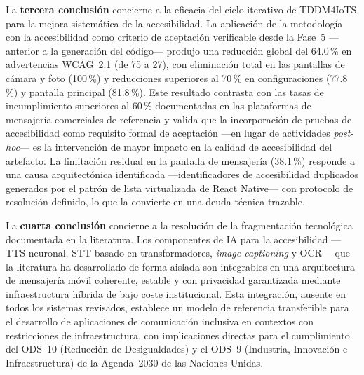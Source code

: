 \documentclass[journal]{IEEEtran}
\begin{document}
		La \textbf{tercera conclusi\'on} concierne a la eficacia del ciclo iterativo de TDDM4IoTS para la mejora sistem\'atica de la accesibilidad. La aplicaci\'on de la metodolog\'ia \cite{guerrero2020} con la accesibilidad como criterio de aceptaci\'on verificable desde la Fase~5 ---anterior a la generaci\'on del c\'odigo--- produjo una reducci\'on global del 64.0\,\% en advertencias WCAG~2.1 (de 75 a 27), con eliminaci\'on total en las pantallas de c\'amara y foto (100\,\%) y reducciones superiores al 70\,\% en configuraciones (77.8\,\%) y pantalla principal (81.8\,\%). Este resultado contrasta con las tasas de incumplimiento superiores al 60\,\% documentadas en las plataformas de mensajer\'ia comerciales de referencia \cite{chen2022} y valida que la incorporaci\'on de pruebas de accesibilidad como requisito formal de aceptaci\'on ---en lugar de actividades \textit{post-hoc}--- es la intervenci\'on de mayor impacto en la calidad de accesibilidad del artefacto. La limitaci\'on residual en la pantalla de mensajer\'ia (38.1\,\%) responde a una causa arquitect\'onica identificada ---identificadores de accesibilidad duplicados generados por el patr\'on de lista virtualizada de React Native--- con protocolo de resoluci\'on definido, lo que la convierte en una deuda t\'ecnica trazable.
		
		La \textbf{cuarta conclusi\'on} concierne a la resoluci\'on de la fragmentaci\'on tecnol\'ogica documentada en la literatura. Los componentes de IA para la accesibilidad ---TTS neuronal, STT basado en transformadores, \textit{image captioning} y OCR--- que la literatura ha desarrollado de forma aislada \cite{tan2021, baevski2020, radford2023, ming2022, mukherjee2023} son integrables en una arquitectura de mensajer\'ia m\'ovil coherente, estable y con privacidad garantizada mediante infraestructura h\'ibrida de bajo coste institucional. Esta integraci\'on, ausente en todos los sistemas revisados, establece un modelo de referencia transferible para el desarrollo de aplicaciones de comunicaci\'on inclusiva en contextos con restricciones de infraestructura, con implicaciones directas para el cumplimiento del ODS~10 (Reducci\'on de Desigualdades) y el ODS~9 (Industria, Innovaci\'on e Infraestructura) de la Agenda~2030 de las Naciones Unidas.
		
\end{document}
